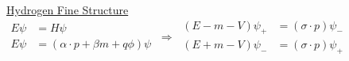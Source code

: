 \documentclass[12pt]{article}
\begin{document}
%
%
%
\newpage
\noindent
\underline{Hydrogen Fine Structure}\\[5pt]
\(
    \begin{aligned}
        E \psi & = H \psi\\
        E \psi & = (\alpha \cdot p + \beta m + q\phi) \psi
    \end{aligned}
    \ \Rightarrow\ 
    \begin{aligned}
        ( E - m - V ) \psi_+ & = ( \sigma \cdot p ) \psi_-\\
        ( E + m - V ) \psi_- & = ( \sigma \cdot p ) \psi_+
    \end{aligned}            
\)
\end{document}
